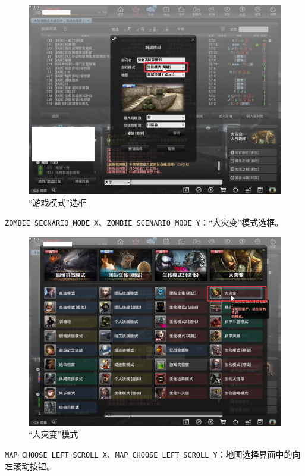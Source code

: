 \begin{figure}[H]
    \Centering
    \includegraphics[width=\textwidth]{docs/assets/game_mode.png}
    \caption{“游戏模式”选框}
\end{figure}

\lstinline{ZOMBIE_SECNARIO_MODE_X}、\lstinline{ZOMBIE_SCENARIO_MODE_Y}：“大灾变”模式选框。

\begin{figure}[H]
    \Centering
    \includegraphics[width=\textwidth]{docs/assets/zombie_scenario.png}
    \caption{“大灾变”模式}
\end{figure}

\lstinline{MAP_CHOOSE_LEFT_SCROLL_X}、\lstinline{MAP_CHOOSE_LEFT_SCROLL_Y}：地图选择界面中的向左滚动按钮。

